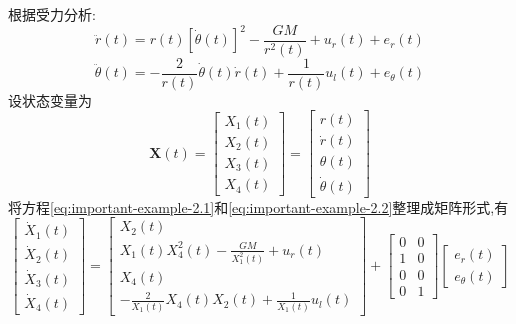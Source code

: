 \documentclass[cn,10pt,citestyle=gb7714-2015,bibstyle=gb7714-2015]{elegantbook}
\begin{document}
\begin{solution}
  根据受力分析:
  \begin{equation}\label{eq:important-example-2.1}
    \ddot{r}(t)=r(t)[\dot{\theta}(t)]^2-\frac{GM}{r^2(t)}+u_r(t)+e_r(t)
  \end{equation}
  \begin{equation}\label{eq:important-example-2.2}
    \ddot{\theta}(t)=-\frac{2}{r(t)}\dot{\theta}(t)\dot{r}(t)+\frac{1}{r(t)}u_l(t)+e_{\theta}(t)
  \end{equation}
  设状态变量为
  \[
      \bm{X}(t)=\begin{bmatrix}
        X_1(t)\\
        X_2(t)\\
        X_3(t)\\
        X_4(t)
      \end{bmatrix}=
      \begin{bmatrix}
        r(t)\\
        \dot{r}(t)\\
        \theta(t)\\
        \dot{\theta}(t)
      \end{bmatrix}
  \]
  将方程\eqref{eq:important-example-2.1}和\eqref{eq:important-example-2.2}整理成矩阵形式,有
  \begin{equation}\label{eq:important-example-2.3}
    \begin{bmatrix}
      \dot{X}_1(t)\\
      \dot{X}_2(t)\\
      \dot{X}_3(t)\\
      \dot{X}_4(t)
    \end{bmatrix}=
    \begin{bmatrix}
      X_2(t)\\
      X_1(t)X_4^2(t)-\frac{GM}{X_1^2(t)}+u_r(t)\\
      X_4(t)\\
      -\frac{2}{X_1(t)}X_4(t)X_2(t)+\frac{1}{X_1(t)}u_l(t)
    \end{bmatrix}+
    \begin{bmatrix}
      0&0\\
      1&0\\
      0&0\\
      0&1
    \end{bmatrix}
    \begin{bmatrix}
      e_r(t)\\
      e_\theta(t)
    \end{bmatrix}
  \end{equation}

\end{solution}
\end{document}

